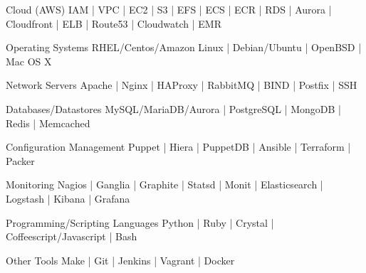 

\begin{cvskills}

  \cvskill
    {Cloud (AWS)} %
    { IAM | VPC | EC2 | S3 | EFS | ECS | ECR | RDS | Aurora | Cloudfront | ELB | Route53 | Cloudwatch | EMR} %

  \cvskill
    {Operating Systems}
    {RHEL/Centos/Amazon Linux | Debian/Ubuntu | OpenBSD | Mac OS X}

  \cvskill
    {Network Servers}
    {Apache | Nginx | HAProxy | RabbitMQ | BIND | Postfix | SSH}

  \cvskill
    {Databases/Datastores}
    {MySQL/MariaDB/Aurora | PostgreSQL | MongoDB | Redis | Memcached}

  \cvskill
    {Configuration Management}
    {Puppet | Hiera | PuppetDB | Ansible | Terraform | Packer}

  \cvskill
    {Monitoring}
    {Nagios | Ganglia | Graphite | Statsd | Monit | Elasticsearch | Logstash | Kibana | Grafana}

  \cvskill
    {Programming/Scripting Languages}
    {Python | Ruby | Crystal | Coffeescript/Javascript | Bash}

  \cvskill
    {Other Tools}
    {Make | Git | Jenkins | Vagrant | Docker}

\end{cvskills}
